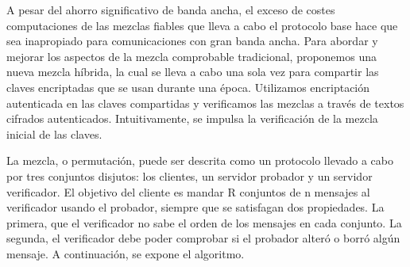 A pesar del ahorro significativo de banda ancha, el exceso de costes computaciones de las mezclas fiables que lleva a cabo el protocolo base hace que sea inapropiado para comunicaciones con gran banda ancha. Para abordar y mejorar los aspectos de la mezcla comprobable tradicional, proponemos una nueva mezcla híbrida, la cual se lleva a cabo una sola vez para compartir las claves encriptadas que se usan durante una época. Utilizamos encriptación autenticada en las claves compartidas y verificamos las mezclas a través de textos cifrados autenticados. Intuitivamente, se impulsa la verificación de la mezcla inicial de las claves.

La mezcla, o permutación, puede ser descrita como un protocolo llevado a cabo por tres conjuntos disjutos: los clientes, un servidor probador y un servidor verificador. El objetivo del cliente es mandar R conjuntos de n mensajes al verificador usando el probador, siempre que se satisfagan dos propiedades. La primera, que el verificador no sabe el orden de los mensajes en cada conjunto. La segunda, el verificador debe poder comprobar si el probador alteró o borró algún mensaje. A continuación, se expone el algoritmo. \\

